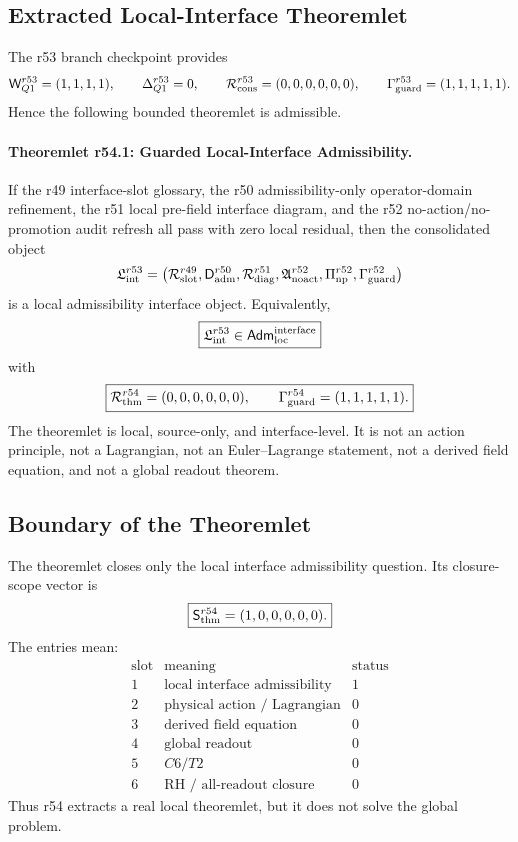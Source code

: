\subsection{Extracted Local-Interface Theoremlet}
\label{subsec:r54-extracted-local-interface-theoremlet}

The r53 branch checkpoint provides
\[
\mathsf W_{Q1}^{r53}=(1,1,1,1),
\qquad
\Delta_{Q1}^{r53}=0,
\qquad
\mathcal R_{\rm cons}^{r53}=(0,0,0,0,0,0),
\qquad
\Gamma_{\rm guard}^{r53}=(1,1,1,1,1).
\]
Hence the following bounded theoremlet is admissible.

\paragraph{Theoremlet r54.1: Guarded Local-Interface Admissibility.}
If the r49 interface-slot glossary, the r50 admissibility-only operator-domain refinement, the r51 local pre-field interface diagram, and the r52 no-action/no-promotion audit refresh all pass with zero local residual, then the consolidated object
\[
\mathfrak L_{\rm int}^{r53}
=\left(
\mathcal R_{\rm slot}^{r49},
\mathsf D_{\rm adm}^{r50},
\mathcal R_{\rm diag}^{r51},
\mathfrak A_{\rm noact}^{r52},
\Pi_{\rm np}^{r52},
\Gamma_{\rm guard}^{r52}
\right)
\]
is a local admissibility interface object.  Equivalently,
\[
\boxed{
\mathfrak L_{\rm int}^{r53}\in
\mathsf{Adm}_{\rm loc}^{\rm interface}
}
\]
with
\[
\boxed{
\mathcal R_{\rm thm}^{r54}=(0,0,0,0,0,0),
\qquad
\Gamma_{\rm guard}^{r54}=(1,1,1,1,1).
}
\]
The theoremlet is local, source-only, and interface-level.  It is not an action principle, not a Lagrangian, not an Euler--Lagrange statement, not a derived field equation, and not a global readout theorem.

\subsection{Boundary of the Theoremlet}
\label{subsec:r54-boundary-of-theoremlet}

The theoremlet closes only the local interface admissibility question.  Its closure-scope vector is
\[
\boxed{
\mathsf S_{\rm thm}^{r54}=(1,0,0,0,0,0).
}
\]
The entries mean:
\[
\begin{array}{c|c|c}
\text{slot} & \text{meaning} & \text{status}\\
\hline
1 & \text{local interface admissibility} & 1\\
2 & \text{physical action / Lagrangian} & 0\\
3 & \text{derived field equation} & 0\\
4 & \text{global readout} & 0\\
5 & C6/T2 & 0\\
6 & \text{RH / all-readout closure} & 0
\end{array}
\]
Thus r54 extracts a real local theoremlet, but it does not solve the global problem.

